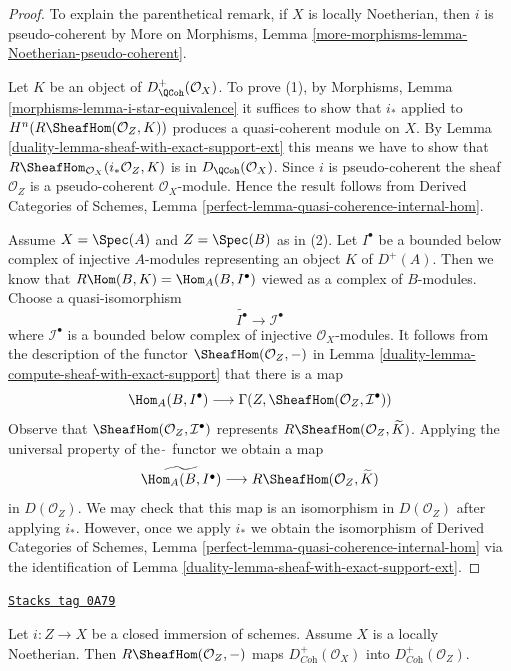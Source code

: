 \begin{proof}

To explain the parenthetical remark, if $X$ is locally Noetherian, then
$i$ is pseudo-coherent by
More on Morphisms, Lemma \ref{more-morphisms-lemma-Noetherian-pseudo-coherent}.

\medskip\noindent
Let $K$ be an object of $D^+_\QCoh(\mathcal{O}_X)$. To prove (1), by
Morphisms, Lemma \ref{morphisms-lemma-i-star-equivalence}
it suffices to show that $i_*$ applied to
$H^n(R\SheafHom(\mathcal{O}_Z, K))$ produces a
quasi-coherent module on $X$. By
Lemma \ref{duality-lemma-sheaf-with-exact-support-ext}
this means we have to show that
$R\SheafHom_{\mathcal{O}_X}(i_*\mathcal{O}_Z, K)$
is in $D_\QCoh(\mathcal{O}_X)$. Since $i$ is pseudo-coherent
the sheaf $\mathcal{O}_Z$ is a pseudo-coherent $\mathcal{O}_X$-module.
Hence the result follows from
Derived Categories of Schemes, Lemma
\ref{perfect-lemma-quasi-coherence-internal-hom}.

\medskip\noindent
Assume $X = \Spec(A)$ and $Z = \Spec(B)$ as in (2).
Let $I^\bullet$ be a bounded below complex of injective $A$-modules
representing an object $K$ of $D^+(A)$.
Then we know that $R\Hom(B, K) = \Hom_A(B, I^\bullet)$ viewed
as a complex of $B$-modules. Choose a quasi-isomorphism
$$
\widetilde{I^\bullet} \longrightarrow \mathcal{I}^\bullet
$$
where $\mathcal{I}^\bullet$ is a bounded below complex of injective
$\mathcal{O}_X$-modules. It follows from the description of
the functor $\SheafHom(\mathcal{O}_Z, -)$ in
Lemma \ref{duality-lemma-compute-sheaf-with-exact-support}
that there is a map
$$
\Hom_A(B, I^\bullet)
\longrightarrow
\Gamma(Z, \SheafHom(\mathcal{O}_Z, \mathcal{I}^\bullet))
$$
Observe that $\SheafHom(\mathcal{O}_Z, \mathcal{I}^\bullet)$
represents $R\SheafHom(\mathcal{O}_Z, \widetilde{K})$.
Applying the universal property of the $\widetilde{\ }$ functor we
obtain a map
$$
\widetilde{\Hom_A(B, I^\bullet)}
\longrightarrow
R\SheafHom(\mathcal{O}_Z, \widetilde{K})
$$
in $D(\mathcal{O}_Z)$. We may check that this map is an isomorphism in
$D(\mathcal{O}_Z)$ after applying $i_*$. However, once we apply
$i_*$ we obtain the isomorphism of Derived Categories of Schemes,
Lemma \ref{perfect-lemma-quasi-coherence-internal-hom}
via the identification of
Lemma \ref{duality-lemma-sheaf-with-exact-support-ext}.
\end{proof}

\begin{lemma}
\label{duality-lemma-sheaf-with-exact-support-coherent}
\href{https://stacks.math.columbia.edu/tag/0A79}{\texttt{Stacks tag 0A79}}

Let $i : Z \to X$ be a closed immersion of schemes.
Assume $X$ is a locally Noetherian.
Then $R\SheafHom(\mathcal{O}_Z, -)$ maps $D^+_{\textit{Coh}}(\mathcal{O}_X)$
into $D^+_{\textit{Coh}}(\mathcal{O}_Z)$.
\end{lemma}

